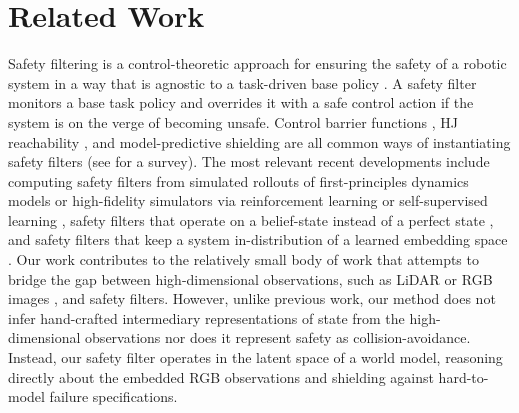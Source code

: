 \section{Related Work}


Safety filtering is a control-theoretic approach for ensuring the safety of a robotic system in a way that is agnostic to a task-driven base policy \cite{hsu2023safety}. 
A safety filter monitors a base task policy and overrides it with a safe control action if the system is on the verge of becoming unsafe. Control barrier functions \cite{ames2019control}, HJ reachability \cite{margellos2011hamilton, mitchell2005time, Fisac15}, and model-predictive shielding \cite{wabersich2022predictive} are all common ways of instantiating safety filters (see \cite{wabersich2023data} for a survey). 
The most relevant recent developments include computing safety filters from simulated rollouts of first-principles dynamics models or high-fidelity simulators via reinforcement learning or self-supervised learning \cite{hsu2023isaacs, hsu2021safety, fisac2019bridging, bansal2021deepreach, robey2020learning}, safety filters that operate on a belief-state instead of a perfect state \cite{ahmadi2019safe, bajcsy2021analyzing, hu2023deception, vahs2023belief}, and safety filters that keep a system in-distribution of a learned embedding space \cite{castaneda2023distribution}. 
Our work contributes to the relatively small body of work that attempts to bridge the gap between high-dimensional observations, such as LiDAR \cite{lin2024filterdeployallrobust, AgileButSafe} or RGB images \cite{tong2023enforcing, hsuren2022slr}, and safety filters. 
However, unlike previous work, our method does not infer hand-crafted intermediary representations of state from the high-dimensional observations nor does it represent safety as collision-avoidance. 
Instead, our safety filter operates in the latent space of a world model, reasoning directly about the embedded RGB observations and shielding against hard-to-model failure specifications.

